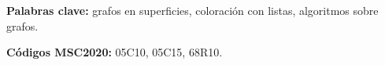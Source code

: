 \documentclass{report}
\theoremstyle{definition}
\begin{document}
\textbf{Palabras clave:} grafos en superficies, coloración con listas, algoritmos sobre grafos.

\textbf{Códigos MSC2020:} 05C10, 05C15, 68R10.

\newpage

\tableofcontents

\newpage













\newpage


\printbibliography
\end{document}
